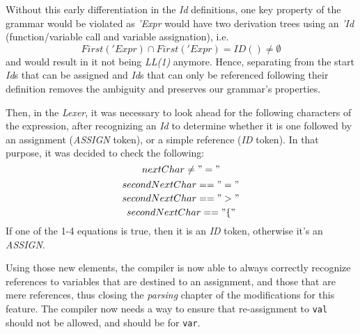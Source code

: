 Without this early differentiation in the \textit{Id} definitions, one key property of the grammar would be violated as \textit{'Expr} would have two derivation trees using an \textit{'Id} (function/variable call and variable assignation), i.e. 
\begin{equation*}
    First('Expr) \cap First('Expr) = {ID()} \not= \emptyset
\end{equation*}
and would result in it not being \textit{LL(1)} anymore. Hence, separating from the start \textit{Id}s that can be assigned and \textit{Id}s that can only be referenced following their definition removes the ambiguity and preserves our grammar's properties.

Then, in the \textit{Lexer}, it was necessary to look ahead for the following characters of the expression, after recognizing an \textit{Id} to determine whether it is one followed by an assignment (\textit{ASSIGN} token), or a simple reference (\textit{ID} token). In that purpose, it was decided to check the following: 
\begin{equation}
    nextChar \not= "="
\end{equation}
\begin{equation}
    secondNextChar == "="
\end{equation}
\begin{equation}
    secondNextChar == ">"
\end{equation}
\begin{equation}
   secondNextChar == "\{"
\end{equation}
If one of the 1-4 equations is true, then it is an \textit{ID} token, otherwise it's an \textit{ASSIGN}.

Using those new elements, the compiler is now able to always correctly recognize references to variables that are destined to an assignment, and those that are mere references, thus closing the \textit{parsing} chapter of the modifications for this feature. The compiler now needs a way to ensure that re-assignment to \texttt{val} should not be allowed, and should be for \texttt{var}. 

